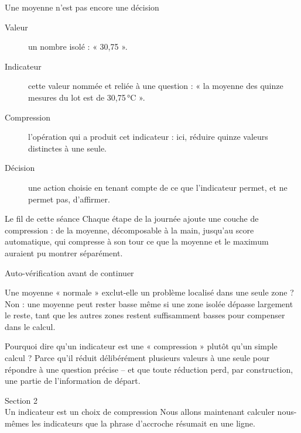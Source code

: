 \documentclass[aspectratio=169]{beamer}
\begin{document}
\begin{frame}{Une moyenne n'est pas encore une décision}
  \begin{description}
    \item[Valeur] un nombre isolé : « 30,75 ».
    \item[Indicateur] cette valeur nommée et reliée à une question : « la moyenne des quinze mesures du lot est de 30,75\,°C ».
    \item[Compression] l'opération qui a produit cet indicateur : ici, réduire quinze valeurs distinctes à une seule.
    \item[Décision] une action choisie en tenant compte de ce que l'indicateur permet, et ne permet pas, d'affirmer.
  \end{description}
  \begin{block}{Le fil de cette séance}
    Chaque étape de la journée ajoute une couche de compression : de la moyenne, décomposable à la main, jusqu'au score automatique, qui compresse à son tour ce que la moyenne et le maximum auraient pu montrer séparément.
  \end{block}
\end{frame}

\begin{frame}{Auto-vérification avant de continuer}
  \small
  \begin{block}{Une moyenne « normale » exclut-elle un problème localisé dans une seule zone ?}
    Non : une moyenne peut rester basse même si une zone isolée dépasse largement le reste, tant que les autres zones restent suffisamment basses pour compenser dans le calcul.
  \end{block}
  \begin{block}{Pourquoi dire qu'un indicateur est une « compression » plutôt qu'un simple calcul ?}
    Parce qu'il réduit délibérément plusieurs valeurs à une seule pour répondre à une question précise -- et que toute réduction perd, par construction, une partie de l'information de départ.
  \end{block}
\end{frame}

\begin{frame}[plain]
  \centering
  \Huge Section 2\\[3mm]
  \Large Un indicateur est un choix de compression
  \vfill
  \normalsize Nous allons maintenant calculer nous-mêmes les indicateurs que la phrase d'accroche résumait en une ligne.
\end{frame}
\end{document}
